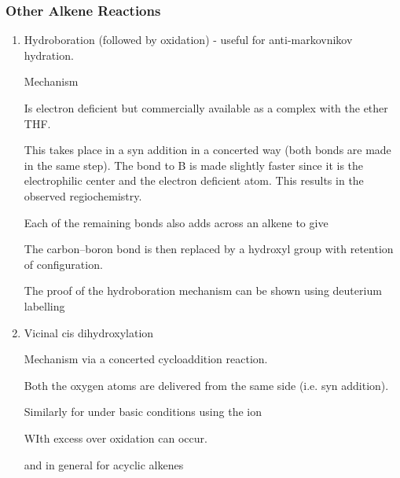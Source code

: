 \subsubsection{Other Alkene Reactions}

\begin{enumerate}[label=\alph*)]

  \item Hydroboration (followed by oxidation) - useful for anti-markovnikov
    hydration.


    Mechanism


    Is electron deficient but commercially available as a complex with the ether
    THF.


    This takes place in a syn addition in a concerted way (both bonds are made
    in the same step). The bond to B is made slightly faster since it is the
    electrophilic center and the electron deficient atom. This results in the
    observed regiochemistry.

    Each of the remaining  bonds also adds across an alkene to give


    The carbon--boron bond is then replaced by a hydroxyl group with retention
    of configuration.


    The proof of the hydroboration mechanism can be shown using deuterium labelling


  \item Vicinal cis dihydroxylation


    Mechanism via a concerted cycloaddition reaction.


    Both the oxygen atoms are delivered from the same side (i.e. syn addition).

    Similarly for  under basic conditions using the ion


    WIth excess  over oxidation can occur.


    and in general for acyclic alkenes


\end{enumerate}

